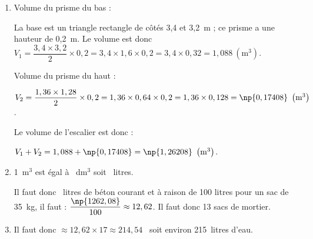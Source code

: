 \documentclass[10pt]{article}
\begin{document}
\begin{enumerate}
\item %
Volume du prisme du bas :

La base est un triangle rectangle de côtés 3,4 et 3,2~m ; ce prisme a une hauteur de 0,2~m. Le volume est donc $V_1 = \dfrac{3,4 \times 3,2}{2} \times 0,2 = 3,4 \times 1,6 \times 0,2 = 3,4\times 0,32 = 1,088~\left(\text{m}^3\right)$.

Volume du prisme du haut :

$V_2 = \dfrac{1,36 \times 1,28}{2} \times 0,2 = 1,36 \times 0,64 \times 0,2 = 1,36 \times 0,128 = \np{0,17408}~\left(\text{m}^3\right)$.

Le volume de l'escalier est donc :

$V_1 + V_2 = 1,088 + \np{0,17408} = \np{1,26208}~\left(\text{m}^3\right)$.
\item %
1~m$^3$ est égal à ~dm$^3$ soit ~litres.

Il faut donc ~litres de béton courant et à raison de 100 litres pour un sac de 35~kg, il faut : $\dfrac{\np{1262,08}}{100} \approx 12,62$. Il faut donc 13 sacs de mortier.
\item %
Il faut donc $\approx 12,62 \times 17 \approx 214,54$~ soit environ 215~litres d'eau.
\end{enumerate}
\end{document}
